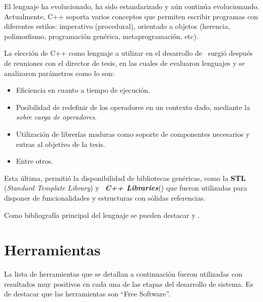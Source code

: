 El lenguaje ha evolucionado, ha sido estandarizado y aún continúa evolucionando. Actualmente, C++ soporta varios conceptos que permiten escribir programas con diferentes estilos: imperativo (procedural), orientado a objetos (herencia, polimorfismo, programación genérica, metaprogramación, etc).

La elección de C++ como lenguaje a utilizar en el desarrollo de \maggen\ surgió después de reuniones con el director de tesis, en las cuales de evaluaron lenguajes y se analizaron parámetros como lo son:

\begin{itemize}
\item Eficiencia en cuanto a tiempo de ejecución.

\item Posibilidad de redefinir de los operadores en un contexto dado, mediante la \textit{sobre carga de operadores}.

\item Utilización de librerías maduras como soporte de componentes necesarios y extras al objetivo de la tesis.

\item Entre otros.
\end{itemize}

Esta última, permitió la disponibilidad de bibliotecas genéricas, como la \textbf{STL} (\textit{Standard Template Library}) y \boost\ \textbf{\textit{C++ Libraries}}(\cite{boost}) que fueron utilizadas para disponer de funcionalidades y estructuras con sólidas referencias.

Como bibliografía principal del lenguaje se pueden destacar \cite{c++1} y \cite{c++2}.

\section{Herramientas}
\label{sec:metoherram}
La lista de herramientas que se detallan a continuación fueron utilizadas con resultados muy positivos en cada una de las etapas del desarrollo de sistema. Es de destacar que las herramientas son ``Free Software''.

